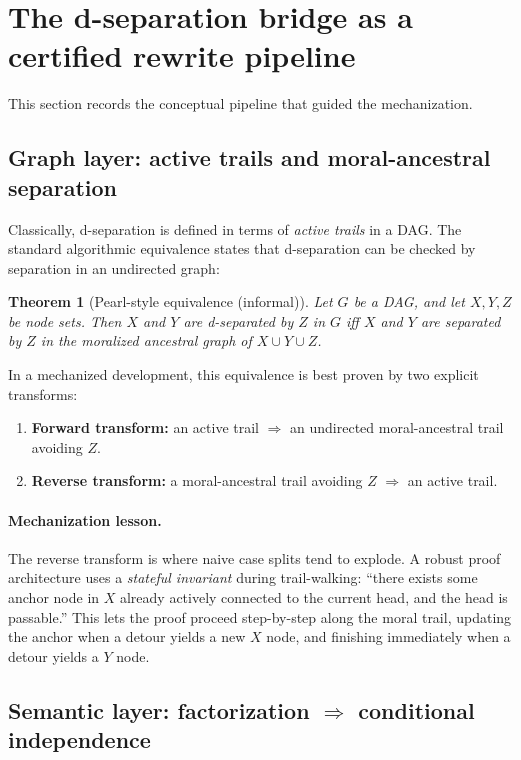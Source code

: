 \documentclass[11pt]{article}
\newtheorem{theorem}{Theorem}
\begin{document}
\section{The d-separation bridge as a certified rewrite pipeline}

This section records the conceptual pipeline that guided the mechanization.

\subsection{Graph layer: active trails and moral-ancestral separation}

Classically, d-separation is defined in terms of \emph{active trails} in a DAG.
The standard algorithmic equivalence states that d-separation can be checked by separation in an undirected graph:

\begin{theorem}[Pearl-style equivalence (informal)]
Let $G$ be a DAG, and let $X,Y,Z$ be node sets.
Then $X$ and $Y$ are d-separated by $Z$ in $G$ iff $X$ and $Y$ are separated by $Z$ in the \emph{moralized ancestral
graph} of $X\cup Y\cup Z$.
\end{theorem}

In a mechanized development, this equivalence is best proven by two explicit transforms:
\begin{enumerate}[leftmargin=2em]
\item \textbf{Forward transform:} an active trail $\Rightarrow$ an undirected moral-ancestral trail avoiding $Z$.
\item \textbf{Reverse transform:} a moral-ancestral trail avoiding $Z$ $\Rightarrow$ an active trail.
\end{enumerate}

\paragraph{Mechanization lesson.}
The reverse transform is where naive case splits tend to explode.
A robust proof architecture uses a \emph{stateful invariant} during trail-walking:
``there exists some anchor node in $X$ already actively connected to the current head, and the head is passable.''
This lets the proof proceed step-by-step along the moral trail, updating the anchor when a detour yields a new $X$ node,
and finishing immediately when a detour yields a $Y$ node.

\subsection{Semantic layer: factorization \texorpdfstring{$\Rightarrow$}{->} conditional independence}
\end{document}

